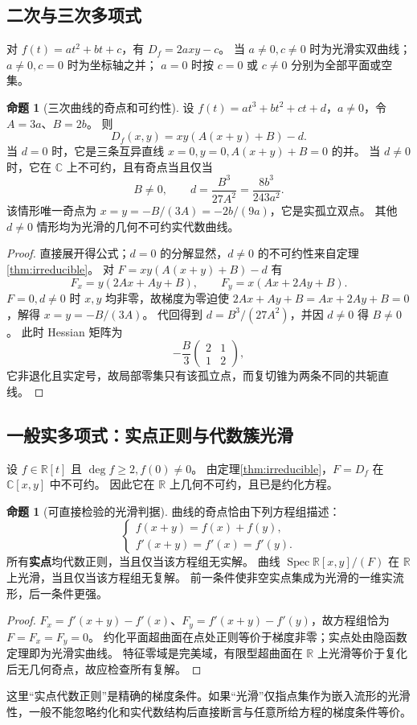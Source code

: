\documentclass[UTF8,11pt,a4paper]{ctexart}
\theoremstyle{definition}
\newtheorem{proposition}[theorem]{命题}
\newcommand{\R}{\mathbb R}
\newcommand{\C}{\mathbb C}
\begin{document}
\subsection{二次与三次多项式}
对 $f(t)=at^2+bt+c$，有 $D_f=2axy-c$。
当 $a\ne0,c\ne0$ 时为光滑实双曲线；$a\ne0,c=0$ 时为坐标轴之并；
$a=0$ 时按 $c=0$ 或 $c\ne0$ 分别为全部平面或空集。

\begin{proposition}[三次曲线的奇点和可约性]\label{prop:cubic}
设 $f(t)=at^3+bt^2+ct+d$，$a\ne0$，令 $A=3a$、$B=2b$。
则
\[
 D_f(x,y)=xy(A(x+y)+B)-d.
\]
当 $d=0$ 时，它是三条互异直线 $x=0,y=0,A(x+y)+B=0$ 的并。
当 $d\ne0$ 时，它在 $\C$ 上不可约，且有奇点当且仅当
\[
 B\ne0,\qquad d=\frac{B^3}{27A^2}
 =\frac{8b^3}{243a^2}.
\]
该情形唯一奇点为 $x=y=-B/(3A)=-2b/(9a)$，它是实孤立双点。
其他 $d\ne0$ 情形均为光滑的几何不可约实代数曲线。
\end{proposition}
\begin{proof}
直接展开得公式；$d=0$ 的分解显然，$d\ne0$ 的不可约性来自定理\ref{thm:irreducible}。
对 $F=xy(A(x+y)+B)-d$ 有
\[
 F_x=y(2Ax+Ay+B),\qquad F_y=x(Ax+2Ay+B).
\]
$F=0,d\ne0$ 时 $x,y$ 均非零，故梯度为零迫使
$2Ax+Ay+B=Ax+2Ay+B=0$，解得 $x=y=-B/(3A)$。
代回得到 $d=B^3/(27A^2)$，并因 $d\ne0$ 得 $B\ne0$。
此时 Hessian 矩阵为
\[
 -\frac{B}{3}\begin{pmatrix}2&1\\1&2\end{pmatrix},
\]
它非退化且实定号，故局部零集只有该孤立点，而复切锥为两条不同的共轭直线。
\end{proof}

\subsection{一般实多项式：实点正则与代数簇光滑}
设 $f\in\R[t]$ 且 $\deg f\ge2,f(0)\ne0$。
由定理\ref{thm:irreducible}，$F=D_f$ 在 $\C[x,y]$ 中不可约。
因此它在 $\R$ 上几何不可约，且已是约化方程。
\begin{proposition}[可直接检验的光滑判据]\label{prop:smooth}
曲线的奇点恰由下列方程组描述：
\begin{equation}\label{eq:singularsystem}
 \begin{cases}
 f(x+y)=f(x)+f(y),\\
 f'(x+y)=f'(x)=f'(y).
 \end{cases}
\end{equation}
所有\textbf{实点}均代数正则，当且仅当该方程组无实解。
曲线 $\operatorname{Spec}\R[x,y]/(F)$ 在 $\R$ 上光滑，当且仅当该方程组无复解。
前一条件使非空实点集成为光滑的一维实流形，后一条件更强。
\end{proposition}
\begin{proof}
$F_x=f'(x+y)-f'(x)$、$F_y=f'(x+y)-f'(y)$，故方程组恰为 $F=F_x=F_y=0$。
约化平面超曲面在点处正则等价于梯度非零；实点处由隐函数定理即为光滑实曲线。
特征零域是完美域，有限型超曲面在 $\R$ 上光滑等价于复化后无几何奇点，故应检查所有复解。
\end{proof}
这里“实点代数正则”是精确的梯度条件。如果“光滑”仅指点集作为嵌入流形的光滑性，一般不能忽略约化和实代数结构后直接断言与任意所给方程的梯度条件等价。
\end{document}
